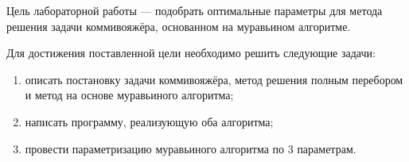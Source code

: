 
Цель лабораторной работы --- подобрать оптимальные параметры для метода решения задачи коммивояжёра, основанном на муравьином алгоритме. 

Для достижения поставленной цели необходимо решить следующие задачи:

\begin{enumerate}
	\item описать постановку задачи коммивояжёра, метод решения полным перебором и метод на основе муравьиного алгоритма;
	\item написать программу, реализующую оба алгоритма;
	\item провести параметризацию муравьиного алгоритма по 3 параметрам.
\end{enumerate}